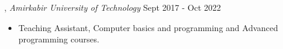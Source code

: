 
, \textit{Amirkabir University of Technology}	\hfill Sept 2017 - Oct 2022
\begin{itemize}
    \item Teaching Assistant, Computer basics and programming and Advanced programming courses.
\end{itemize}
